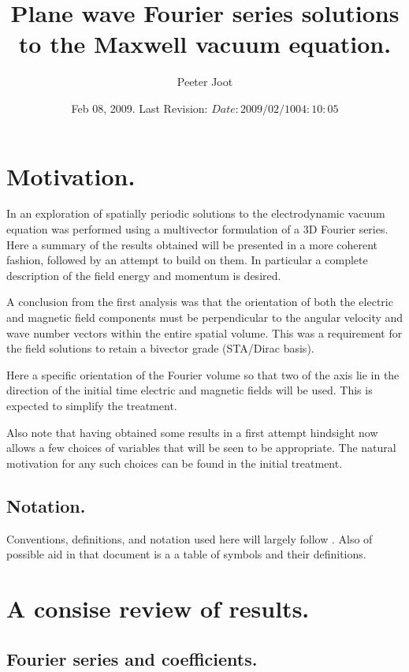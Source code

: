 \documentclass{article}
\title{ Plane wave Fourier series solutions to the Maxwell vacuum equation. }
\author{Peeter Joot}
\date{ Feb 08, 2009.  Last Revision: $Date: 2009/02/10 04:10:05 $ }
\begin{document}
\maketitle{}
\tableofcontents

\section{ Motivation. }

In \cite{PJFourierVacuum} an exploration of spatially periodic solutions to the electrodynamic vacuum equation was performed using a multivector formulation 
of a 3D Fourier series.
Here a summary of the results obtained will be presented in a more
coherent fashion, followed by an attempt to build on them.
In particular a complete
description of the field energy and momentum is desired.

A conclusion from the first analysis was that the
orientation of both the electric and magnetic field components
must be perpendicular to the angular velocity and wave number vectors 
within the entire spatial volume.  This was a requirement for the field
solutions to retain a bivector grade (STA/Dirac basis).

Here a specific orientation of the Fourier volume so that two of the axis
lie in the direction of the initial time electric and magnetic fields will be
used.  This is expected to simplify the treatment.

Also note that having obtained some results in a first attempt hindsight
now allows a few choices of variables that will be seen to be appropriate.
The natural motivation for any such choices can be found in the initial
treatment.

\subsection{ Notation. }

Conventions, definitions, and notation used here will largely follow
\cite{PJFourierVacuum}.  Also of possible aid in that document is a 
a table of symbols and their definitions.

\section{ A consise review of results. }

\subsection{ Fourier series and coefficients. }
\end{document}
